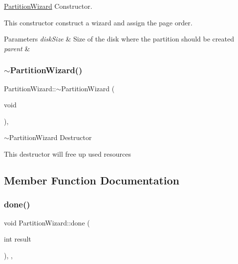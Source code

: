 \mbox{\hyperlink{classui_1_1wizard_1_1_partition_wizard}{Partition\+Wizard}} Constructor. 

This constructor construct a wizard and assign the page order. 
\begin{DoxyParams}{Parameters}
{\em disk\+Size} & Size of the disk where the partition should be created \\
\hline
{\em parent} & \\
\hline
\end{DoxyParams}
\mbox{\label{classui_1_1wizard_1_1_partition_wizard_a356484066944c627c00346690d3ffc80}} 
\subsubsection{\texorpdfstring{$\sim$\+Partition\+Wizard()}{~PartitionWizard()}}
{\footnotesize\ttfamily Partition\+Wizard\+::$\sim$\+Partition\+Wizard (\begin{DoxyParamCaption}\item[{void}]{ }\end{DoxyParamCaption})\hspace{0.3cm}{\ttfamily [override]}, {\ttfamily [virtual]}}



$\sim$\+Partition\+Wizard Destructor 

This destructor will free up used resources 

\subsection{Member Function Documentation}
\mbox{\label{classui_1_1wizard_1_1_partition_wizard_af5141307f45f8fc9bd091c718a0f31b6}} 
\subsubsection{\texorpdfstring{done()}{done()}}
{\footnotesize\ttfamily void Partition\+Wizard\+::done (\begin{DoxyParamCaption}\item[{int}]{result }\end{DoxyParamCaption})\hspace{0.3cm}{\ttfamily [override]}, {\ttfamily [protected]}, {\ttfamily [virtual]}}



